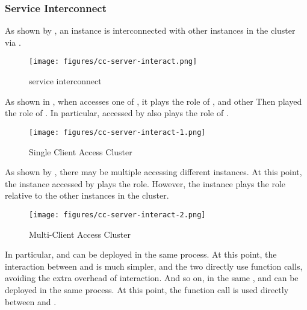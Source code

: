 \begin{content}

\subsubsection{Service Interconnect}

As shown by , an  instance is interconnected with other  instances in the cluster via .

\begin{figure}[H]
\centering
\texttt{[image: figures/cc-server-interact.png]}
\caption{service interconnect}
 \label{fig:cc-server-interact}
\end{figure}

As shown in , when  accesses one of , it plays the role of , and other  Then played the role of . In particular,  accessed by  also plays the role of .

\begin{figure}[H]
\centering
\texttt{[image: figures/cc-server-interact-1.png]}
\caption{Single Client Access Cluster}
 \label{fig:cc-server-interact-1}
\end{figure}

As shown by , there may be multiple  accessing different  instances. At this point, the  instance accessed by  plays the  role. However, the  instance plays the  role relative to the other  instances in the cluster.

\begin{figure}[H]
\centering
\texttt{[image: figures/cc-server-interact-2.png]}
\caption{Multi-Client Access Cluster}
 \label{fig:cc-server-interact-2}
\end{figure}

In particular,  and  can be deployed in the same process. At this point, the interaction between  and  is much simpler, and the two directly use function calls, avoiding the extra overhead of  interaction. And so on, in the same ,  and  can be deployed in the same process. At this point, the function call is used directly between  and .


\end{content}
